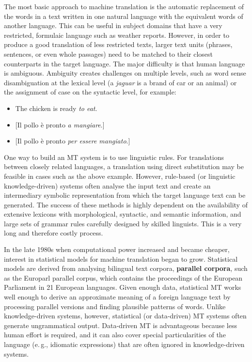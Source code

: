 \begin{multicols}{2}
The most basic approach to machine translation is the automatic replacement of the words in a text written in one natural language with the equivalent words of another language. This can be useful in subject domains that have a very restricted, formulaic language such as weather reports.  However, in order to produce a good translation of less restricted texts, larger text units (phrases, sentences, or even whole passages) need to be matched to their closest counterparts in the target language. The major difficulty is that human language is ambiguous. Ambiguity creates challenges on multiple levels, such as word sense disambiguation at the lexical level (a \textit{jaguar} is a brand of car or an animal) or the assignment of case on the syntactic level, for example:

\begin{itemize}
\item The chicken is ready \emph{to eat}.
\item {[}Il pollo  \`{e} pronto \emph{a mangiare}.{]}
\item {[}Il pollo  \`{e} pronto \emph{per essere mangiato}.{]}
\end{itemize}


One way to build an MT system is to use linguistic rules. For translations between closely related languages, a translation using direct substitution may be feasible in cases such as the above example. However, rule-based (or linguistic knowledge-driven) systems often analyse the input text and create an intermediary symbolic representation from which the target language text can be generated. The success of these methods is highly dependent on the availability of extensive lexicons with morphological, syntactic, and semantic information, and large sets of grammar rules carefully designed by skilled linguists. This is a very long and therefore costly process.
 
In the late 1980s when computational power increased and became cheaper, interest in statistical models for machine translation began to grow. Statistical models are derived from analysing bilingual text corpora, \textbf{parallel corpora}, such as the Europarl parallel corpus, which contains the proceedings of the European Parliament in 21 European languages. Given enough data, statistical MT works well enough to derive an approximate meaning of a foreign language text by processing parallel versions and finding plausible patterns of words. Unlike knowledge-driven systems, however, statistical (or data-driven) MT systems often generate ungrammatical output. Data-driven MT is advantageous because less human effort is required, and it can also cover special particularities of the language (e.\,g., idiomatic expressions) that are often ignored in knowledge-driven systems. 


\end{multicols}
